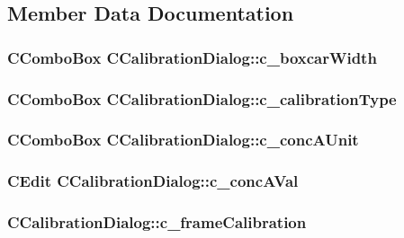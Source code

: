 \subsection{Member Data Documentation}
\hypertarget{classCCalibrationDialog_ab6fc45fb9d6bb1174b444efd4ae04725}{
\subsubsection[{c\_\-boxcarWidth}]{\setlength{\rightskip}{0pt plus 5cm}CComboBox {\bf CCalibrationDialog::c\_\-boxcarWidth}}}
\label{classCCalibrationDialog_ab6fc45fb9d6bb1174b444efd4ae04725}
\hypertarget{classCCalibrationDialog_a9c2d4ea81e9024d6ed8d4fea43c7b866}{
\subsubsection[{c\_\-calibrationType}]{\setlength{\rightskip}{0pt plus 5cm}CComboBox {\bf CCalibrationDialog::c\_\-calibrationType}}}
\label{classCCalibrationDialog_a9c2d4ea81e9024d6ed8d4fea43c7b866}
\hypertarget{classCCalibrationDialog_af9ce66ade6c343a603a907dd436a2461}{
\subsubsection[{c\_\-concAUnit}]{\setlength{\rightskip}{0pt plus 5cm}CComboBox {\bf CCalibrationDialog::c\_\-concAUnit}}}
\label{classCCalibrationDialog_af9ce66ade6c343a603a907dd436a2461}
\hypertarget{classCCalibrationDialog_abacb72fe4123d5209a1811aec7720d6f}{
\subsubsection[{c\_\-concAVal}]{\setlength{\rightskip}{0pt plus 5cm}CEdit {\bf CCalibrationDialog::c\_\-concAVal}}}
\label{classCCalibrationDialog_abacb72fe4123d5209a1811aec7720d6f}
\hypertarget{classCCalibrationDialog_a590aeaff751390fe3ef3b9aa681b3309}{
\subsubsection[{c\_\-frameCalibration}]{ {\bf CCalibrationDialog::c\_\-frameCalibration}}}
